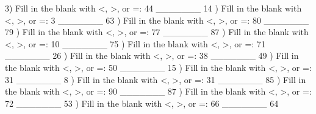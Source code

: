 \documentclass{article}%
\begin{document}
3) Fill in the blank with <, >, or =: 44 \_\_\_\_\_\_\_ 14%
\newline%
\newline%
) Fill in the blank with <, >, or =: 3 \_\_\_\_\_\_\_ 63%
\newline%
\newline%
) Fill in the blank with <, >, or =: 80 \_\_\_\_\_\_\_ 79%
\newline%
\newline%
) Fill in the blank with <, >, or =: 77 \_\_\_\_\_\_\_ 87%
\newline%
\newline%
) Fill in the blank with <, >, or =: 10 \_\_\_\_\_\_\_ 75%
\newline%
\newline%
) Fill in the blank with <, >, or =: 71 \_\_\_\_\_\_\_ 26%
\newline%
\newline%
) Fill in the blank with <, >, or =: 38 \_\_\_\_\_\_\_ 49%
\newline%
\newline%
) Fill in the blank with <, >, or =: 50 \_\_\_\_\_\_\_ 15%
\newline%
\newline%
) Fill in the blank with <, >, or =: 31 \_\_\_\_\_\_\_ 8%
\newline%
\newline%
) Fill in the blank with <, >, or =: 31 \_\_\_\_\_\_\_ 85%
\newline%
\newline%
) Fill in the blank with <, >, or =: 90 \_\_\_\_\_\_\_ 87%
\newline%
\newline%
) Fill in the blank with <, >, or =: 72 \_\_\_\_\_\_\_ 53%
\newline%
\newline%
) Fill in the blank with <, >, or =: 66 \_\_\_\_\_\_\_ 64%
\newline%
\end{document}
